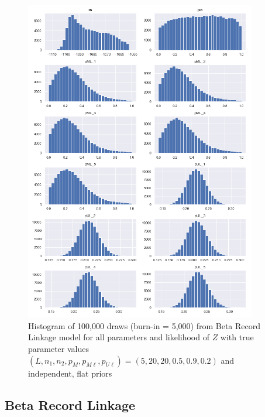 \documentclass[11pt,reqno]{amsart}
\begin{document}
\begin{figure}[h!]
\begin{center}
\includegraphics[width=0.9\textwidth]{../Figures/bpm/nM10/allParam_nM10_L5.png}
\caption{Histogram of 100,000 draws (burn-in = 5,000) from Beta Record Linkage model for all parameters and likelihood of $Z$ with true parameter values $(L, n_1, n_2, p_M, p_{M\ell}, p_{U\ell}) = (5, 20, 20, 0.5, 0.9, 0.2)$ and independent, flat priors}
\label{bpmLarge}
\end{center}
\end{figure}

\subsection{Beta Record Linkage}
\end{document}
